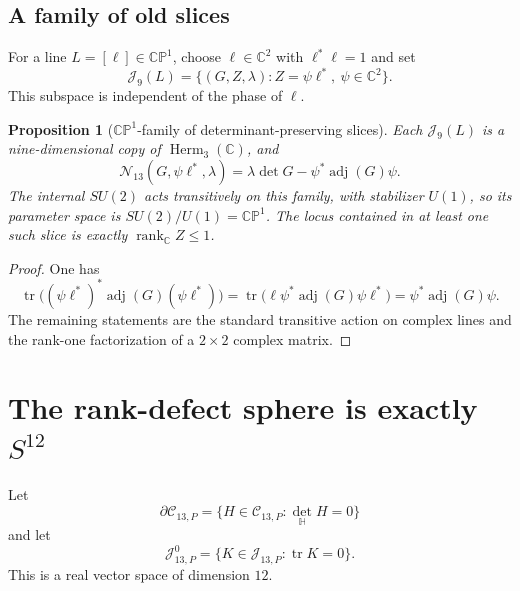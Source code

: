 \documentclass[11pt]{article}
\newtheorem{proposition}[theorem]{Proposition}
\theoremstyle{definition}
\theoremstyle{remark}
\newcommand{\C}{\mathbb C}
\newcommand{\Hh}{\mathbb H}
\newcommand{\CP}{\mathbb {CP}}
\newcommand{\Herm}{\operatorname{Herm}}
\newcommand{\rank}{\operatorname{rank}}
\newcommand{\tr}{\operatorname{tr}}
\newcommand{\adj}{\operatorname{adj}}
\newcommand{\cC}{\mathcal C}
\newcommand{\cJ}{\mathcal J}
\newcommand{\cN}{\mathcal N}
\begin{document}
\subsection{A family of old slices}

For a line $L=[\ell]\in\CP^1$, choose $\ell\in\C^2$ with $\ell^*\ell=1$ and set
\begin{equation}\label{eq:J9L}
 \cJ_9(L)=\{(G,Z,\lambda):Z=\psi\ell^*,\ \psi\in\C^2\}.
\end{equation}
This subspace is independent of the phase of $\ell$.

\begin{proposition}[$\CP^1$-family of determinant-preserving slices]\label{prop:CP1-family}
Each $\cJ_9(L)$ is a nine-dimensional copy of $\Herm_3(\C)$, and
\begin{equation}\label{eq:N-on-L}
 \cN_{13}(G,\psi\ell^*,\lambda)
 =\lambda\det G-\psi^*\adj(G)\psi.
\end{equation}
The internal $SU(2)$ acts transitively on this family, with stabilizer $U(1)$, so its parameter space is $SU(2)/U(1)=\CP^1$.  The locus contained in at least one such slice is exactly $\rank_{\C}Z\le1$.
\end{proposition}

\begin{proof}
One has
\[
 \tr\bigl((\psi\ell^*)^*\adj(G)(\psi\ell^*)\bigr)
 =\tr\bigl(\ell\psi^*\adj(G)\psi\ell^*\bigr)
 =\psi^*\adj(G)\psi.
\]
The remaining statements are the standard transitive action on complex lines and the rank-one factorization of a $2\times2$ complex matrix.
\end{proof}

\section{The rank-defect sphere is exactly \texorpdfstring{$S^{12}$}{S12}}

Let
\begin{equation}\label{eq:boundary13}
 \partial\cC_{13,P}
 =\{H\in\cC_{13,P}:\det_{\Hh}H=0\}
\end{equation}
and let
\begin{equation}\label{eq:tracefree13}
 \cJ_{13,P}^0=\{K\in\cJ_{13,P}:\tr K=0\}.
\end{equation}
This is a real vector space of dimension $12$.
\end{document}
